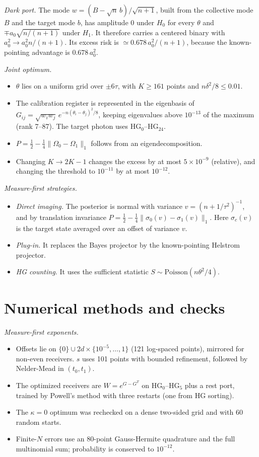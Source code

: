 \emph{Dark port.} The mode $w=(B-\sqrt n\,b)/\sqrt{n+1}$, built from the collective mode $B$ and the target mode $b$,
has amplitude $0$ under $H_0$ for every $\theta$ and $\mp a_0\sqrt{n/(n+1)}$ under $H_1$. It therefore carries a
centered binary with $a_0^2\to a_0^2n/(n+1)$. Its excess risk is $\simeq0.678\,a_0^2/(n+1)$, because the
known-pointing advantage is $0.678\,a_0^2$.

\emph{Joint optimum.}
\begin{itemize}
\item $\theta$ lies on a uniform grid over $\pm6\tau$, with $K\ge161$ points and $n\delta^2/8\le0.01$.
\item The calibration register is represented in the eigenbasis of
  $G_{ij}=\sqrt{w_iw_j}\,e^{-n(\theta_i-\theta_j)^2/8}$, keeping eigenvalues above $10^{-13}$ of the maximum (rank
  7--87). The target photon uses $\mathrm{HG}_0$--$\mathrm{HG}_{24}$.
\item $P=\tfrac12-\tfrac14\|\Omega_0-\Omega_1\|_1$ follows from an eigendecomposition.
\item Changing $K\to2K-1$ changes the excess by at most $5\times10^{-9}$ (relative), and changing the threshold to
  $10^{-11}$ by at most $10^{-12}$.
\end{itemize}

\emph{Measure-first strategies.}
\begin{itemize}
\item \emph{Direct imaging.} The posterior is normal with variance $v=(n+1/\tau^2)^{-1}$, and by translation
  invariance $P=\tfrac12-\tfrac14\|\sigma_0(v)-\sigma_1(v)\|_1$. Here $\sigma_c(v)$ is the target state averaged over
  an offset of variance $v$.
\item \emph{Plug-in.} It replaces the Bayes projector by the known-pointing Helstrom projector.
\item \emph{HG counting.} It uses the sufficient statistic $S\sim\mathrm{Poisson}(n\theta^2/4)$.
\end{itemize}

\section{Numerical methods and checks}
\label{app:numerics}

\emph{Measure-first exponents.}
\begin{itemize}
\item Offsets lie on $\{0\}\cup2d\times\{10^{-5},\dots,1\}$ (121 log-spaced points), mirrored for non-even
  receivers. $s$ uses 101 points with bounded refinement, followed by Nelder-Mead in $(t_0,t_1)$.
\item The optimized receivers are $W=e^{G-G^T}$ on $\mathrm{HG}_0$--$\mathrm{HG}_5$ plus a rest port, trained by
  Powell's method with three restarts (one from HG sorting).
\item The $\kappa=0$ optimum was rechecked on a dense two-sided grid and with 60 random starts.
\item Finite-$N$ errors use an 80-point Gauss-Hermite quadrature and the full multinomial sum; probability is
  conserved to $10^{-12}$.
\end{itemize}

